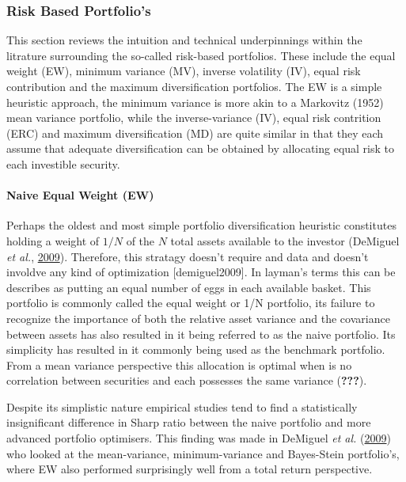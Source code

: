 \documentclass[11pt,preprint, authoryear]{elsarticle}
\numberwithin{equation}{section}
\numberwithin{figure}{section}
\numberwithin{table}{section}
\begin{document}
\hypertarget{risk-based-portfolios}{%
\subsubsection{Risk Based Portfolio's}\label{risk-based-portfolios}}

This section reviews the intuition and technical underpinnings within
the litrature surrounding the so-called risk-based portfolios. These
include the equal weight (EW), minimum variance (MV), inverse volatility
(IV), equal risk contribution and the maximum diversification
portfolios. The EW is a simple heuristic approach, the minimum variance
is more akin to a Markovitz (1952) mean variance portfolio, while the
inverse-variance (IV), equal risk contrition (ERC) and maximum
diversification (MD) are quite similar in that they each assume that
adequate diversification can be obtained by allocating equal risk to
each investible security.

\hypertarget{naive-equal-weight-ew}{%
\paragraph{Naive Equal Weight (EW)}\label{naive-equal-weight-ew}}

Perhaps the oldest and most simple portfolio diversification heuristic
constitutes holding a weight of \(1/N\) of the \(N\) total assets
available to the investor (DeMiguel \emph{et al.},
\protect\hyperlink{ref-demiguel2009}{2009}). Therefore, this stratagy
doesn't require and data and doesn't involdve any kind of optimization
{[}demiguel2009{]}. In layman's terms this can be describes as putting
an equal number of eggs in each available basket. This portfolio is
commonly called the equal weight or 1/N portfolio, its failure to
recognize the importance of both the relative asset variance and the
covariance between assets has also resulted in it being referred to as
the naive portfolio. Its simplicity has resulted in it commonly being
used as the benchmark portfolio. From a mean variance perspective this
allocation is optimal when is no correlation between securities and each
possesses the same variance ({\textbf{???}}).

Despite its simplistic nature empirical studies tend to find a
statistically insignificant difference in Sharp ratio between the naive
portfolio and more advanced portfolio optimisers. This finding was made
in DeMiguel \emph{et al.} (\protect\hyperlink{ref-demiguel2009}{2009})
who looked at the mean-variance, minimum-variance and Bayes-Stein
portfolio's, where EW also performed surprisingly well from a total
return perspective.
\end{document}
